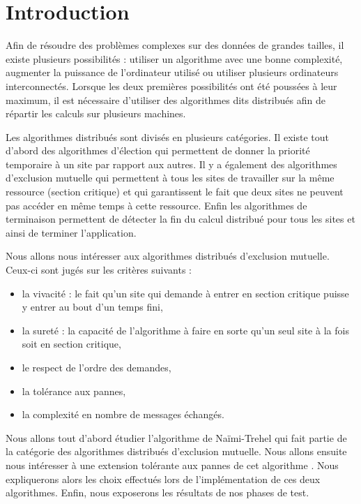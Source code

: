 
\chapter{Introduction}\label{intro}
Afin de résoudre des problèmes complexes sur des données de grandes tailles, il existe plusieurs possibilités : utiliser un algorithme avec une bonne complexité, augmenter la puissance de l'ordinateur utilisé ou utiliser plusieurs ordinateurs interconnectés. Lorsque les deux premières possibilités ont été poussées à leur maximum, il est nécessaire d'utiliser des algorithmes dits distribués afin de répartir les calculs sur plusieurs machines.

Les algorithmes distribués sont divisés en plusieurs catégories. Il existe tout d'abord des algorithmes d'élection qui permettent de donner la priorité temporaire à un site par rapport aux autres. Il y a également des algorithmes d'exclusion mutuelle qui permettent à tous les sites de travailler sur la même ressource (section critique) et qui garantissent le fait que deux sites ne peuvent pas accéder en même temps à cette ressource. Enfin les algorithmes de terminaison permettent de détecter la fin du calcul distribué pour tous les sites et ainsi de terminer l'application.

Nous allons nous intéresser aux algorithmes distribués d'exclusion mutuelle. Ceux-ci sont jugés sur les critères suivants : 

\begin{itemize}
	\item la vivacité : le fait qu'un site qui demande à entrer en section critique puisse y entrer au bout d'un temps fini,
	\item la sureté : la capacité de l'algorithme à faire en sorte qu'un seul site à la fois soit en section critique,
	\item le respect de l'ordre des demandes,
	\item la tolérance aux pannes,
	\item la complexité en nombre de messages échangés.
\end{itemize}

Nous allons tout d'abord étudier l'algorithme de Naïmi-Trehel \cite{naimi1996} qui fait partie de la catégorie des algorithmes distribués d'exclusion mutuelle. Nous allons ensuite nous intéresser à une extension tolérante aux pannes de cet algorithme \cite{sopena2005}. Nous expliquerons alors les choix effectués lors de l'implémentation de ces deux algorithmes. Enfin, nous exposerons les résultats de nos phases de test.

